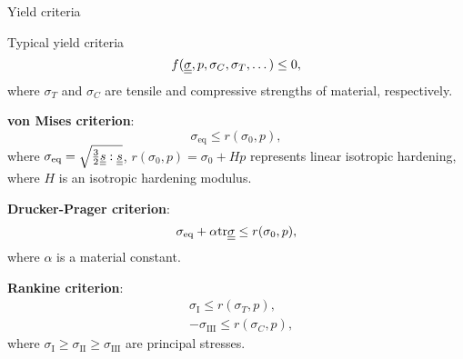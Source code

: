\documentclass[9pt]{beamer}
\begin{document}
\begin{frame}{Yield criteria}
  
  Typical yield criteria
  \begin{equation}\label{eqn:yield_criterion}
    f(\underline{\underline{\sigma}}, p, \sigma_C, \sigma_T, \dots) \leq 0, 
  \end{equation}
  where $\sigma_T$ and $\sigma_C$ are tensile and compressive strengths of material, respectively. 
  \newline 
  
  \textbf{von Mises criterion}:
  \begin{equation}
    \sigma_\text{eq} \leq r(\sigma_0, p),
  \end{equation}
  where $\sigma_\text{eq} = \sqrt{\frac{3}{2}\underline{\underline{s}} : \underline{\underline{s}}}$, $r(\sigma_0, p) = \sigma_0 + Hp$ represents linear isotropic hardening, where $H$ is an isotropic hardening modulus.
  \newline 
  
  \textbf{Drucker-Prager criterion}: 
  \begin{equation}
    \sigma_\text{eq} + \alpha\mathrm{tr}\underline{\underline{\sigma}} \leq r(\sigma_0, p),
  \end{equation}
  where $\alpha$ is a material constant.
  \newline 
  
  \textbf{Rankine criterion}:
  \begin{align*}
    & \sigma_\text{I} \leq r(\sigma_T, p), \\
    & -\sigma_\text{III} \leq r(\sigma_C, p),
  \end{align*}
  where $\sigma_\text{I} \geq \sigma_\text{II} \geq \sigma_\text{III}$ are principal stresses. 
\end{frame}
\end{document}
